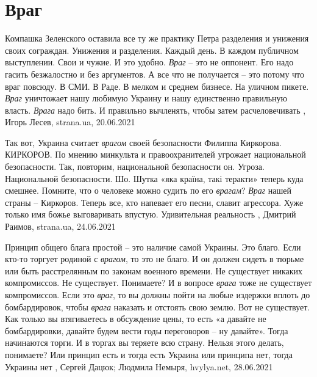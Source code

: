  
 
 
 
 
\chapter{Враг}
\label{sec:slova.vrag}

Компашка Зеленского оставила все ту же практику Петра разделения и унижения
своих сограждан. Унижения и разделения. Каждый день. В каждом публичном
выступлении. Свои и чужие.  И это удобно. \emph{Враг} – это не оппонент. Его надо
гасить безжалостно и без аргументов. А все что не получается – это потому что
враг повсюду. В СМИ. В Раде. В мелком и среднем бизнесе. На уличном пикете.
\emph{Враг} уничтожает нашу любимую Украину и нашу единственно правильную власть.
\emph{Врага} надо бить. И правильно вычленять, чтобы затем расчеловечивать
, 
Игорь Лесев, strana.ua, 20.06.2021

Так вот, Украина считает \emph{врагом} своей безопасности Филиппа Киркорова.
КИРКОРОВ.  По мнению минкульта и правоохранителей угрожает национальной
безопасности. Так, повторим, национальной безопасности он.  Угроза.
Национальной безопасности. Шо.  Шутка «яка країна, такі теракти» теперь куда
смешнее. Помните, что о человеке можно судить по его \emph{врагам}?  \emph{Враг} нашей страны
– Киркоров.  Теперь все, кто напевает его песни, славит агрессора.  Хуже только
имя божье выговаривать впустую.  Удивительная реальность
, Дмитрий Раимов, strana.ua, 24.06.2021

Принцип общего блага простой – это наличие самой Украины. Это благо. Если
кто-то торгует родиной с \emph{врагом}, то это не благо. И он должен сидеть в тюрьме
или быть расстрелянным по законам военного времени. Не существует никаких
компромиссов. Не существует. Понимаете? И в вопросе \emph{врага} тоже не существует
компромиссов. Если это \emph{враг}, то вы должны пойти на любые издержки вплоть до
бомбардировок, чтобы \emph{врага} наказать и отстоять свою землю. Вот не существует.
Как только вы втягиваетесь в обсуждение цены, то есть «а давайте не
бомбардировки, давайте будем вести годы переговоров – ну давайте». Тогда
начинаются торги. И в торгах вы теряете всю страну. Нельзя этого делать,
понимаете? Или принцип есть и тогда есть Украина или принципа нет, тогда
Украины нет
, 
Сергей Дацюк; Людмила Немыря, hvylya.net, 28.06.2021

